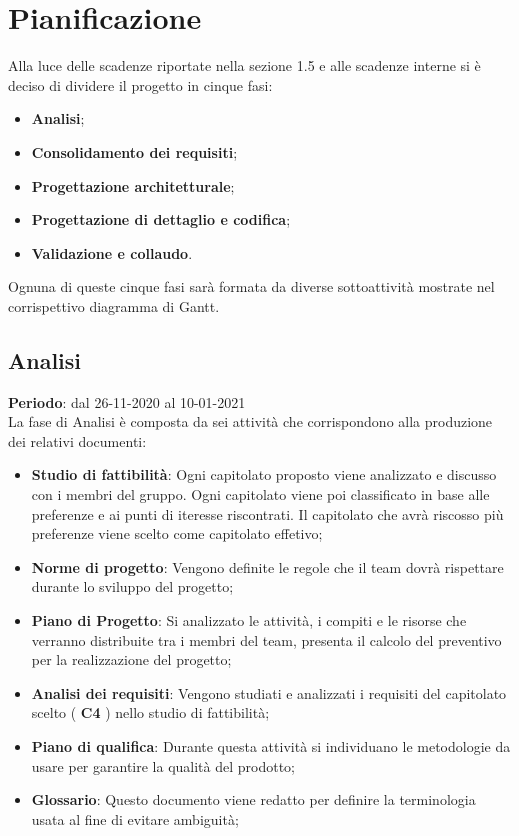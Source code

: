 \section{Pianificazione}
	Alla luce delle scadenze riportate nella sezione 1.5 e alle scadenze interne si è deciso di dividere il progetto in cinque fasi:
	\begin{itemize}
		\item \textbf{Analisi};
		\item \textbf{Consolidamento dei requisiti};
		\item \textbf{Progettazione architetturale};
		\item \textbf{Progettazione di dettaglio e codifica};
		\item \textbf{Validazione e collaudo}.
	\end{itemize}
	Ognuna di queste cinque fasi sarà formata da diverse sottoattività mostrate nel corrispettivo diagramma di Gantt.

	\subsection{Analisi}
	\textbf{Periodo}: dal 26-11-2020 al 10-01-2021 \\
	La fase di Analisi è composta da sei attività che corrispondono alla produzione dei relativi documenti:
	\begin{itemize}
		\item \textbf{Studio di fattibilità}: Ogni capitolato proposto viene analizzato e discusso con i membri del gruppo. Ogni capitolato viene poi classificato in base alle preferenze e ai punti di iteresse riscontrati. Il capitolato che avrà riscosso più preferenze viene scelto come capitolato effetivo;
		\item \textbf{Norme di progetto}: Vengono definite le regole che il team dovrà rispettare durante lo sviluppo del progetto;
		\item \textbf{Piano di Progetto}: Si analizzato le attività, i compiti e le risorse che verranno distribuite tra i membri del team, presenta il calcolo del preventivo per la realizzazione del progetto;
		\item \textbf{Analisi dei requisiti}: Vengono studiati e analizzati i requisiti del capitolato scelto ( \textbf{C4} ) nello studio di fattibilità;
		\item \textbf{Piano di qualifica}: Durante questa attività si individuano le metodologie da usare per garantire la qualità del prodotto;
		\item \textbf{Glossario}: Questo documento viene redatto per definire la terminologia usata al fine di evitare ambiguità;
	\end{itemize}
